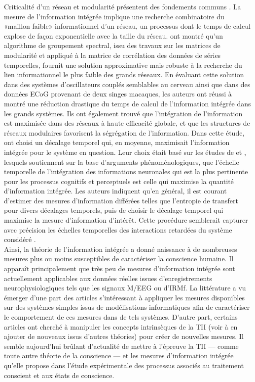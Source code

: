 Criticalité d'un réseau et modularité présentent des fondements communs \citep{toker2019information}. 
La mesure de l'information intégrée implique une recherche combinatoire du «maillon faible» informationnel d'un réseau, un processus dont le temps de calcul explose de façon exponentielle avec la taille du réseau. 
\cite{toker2019information} ont montré qu'un algorithme de groupement spectral, issu des travaux sur les matrices de modularité et appliqué à la matrice de corrélation des données de séries temporelles, fournit une solution approximative mais robuste à la recherche du lien informationnel le plus faible des grands réseaux. 
En évaluant cette solution dans des systèmes d'oscillateurs couplés semblables au cerveau ainsi que dans des données ECoG provenant de deux singes macaques, les auteurs ont réussi à montré une réduction drastique du temps de calcul de l'information intégrée dans les grands systèmes. 
Ils ont également trouvé que l'intégration de l'information est maximisée dans des réseaux à haute efficacité globale, et que les structures de réseaux modulaires favorisent la ségrégation de l'information.
Dans cette étude, \cite{toker2019information} ont choisi un décalage temporel qui, en moyenne, maximisait l'information intégrée pour le système en question. 
Leur choix était basé sur les études de \cite{oizumi2014phenomenology} et \cite{hoel2016can}, lesquels soutiennent sur la base d'arguments phénoménologiques, que l'échelle temporelle de l'intégration des informations neuronales qui est la plus pertinente pour les processus cognitifs et perceptuels est celle qui maximise la quantité d'information intégrée. 
Les auteurs indiquent qu'en général, il est courant d'estimer des mesures d'information différées telles que l'entropie de transfert pour divers décalages temporels, puis de choisir le décalage temporel qui maximise la mesure d'information d'intérêt. 
Cette procédure semblerait capturer avec précision les échelles temporelles des interactions retardées du système considéré \citep{wibral2013measuring}. \\

Ainsi, la théorie de l'information intégrée a donné naissance à de nombreuses mesures plus ou moins susceptibles de caractériser la conscience humaine. 
Il apparaît principalement que très peu de mesures d'information intégrée sont actuellement applicables aux données réelles issues d'enregistrements neurophysiologiques tels que les signaux M/EEG ou d'IRMf. 
La littérature a vu émerger d'une part des articles s'intéressant à appliquer les mesures disponibles sur des systèmes simples issus de modélisations informatiques afin de caractériser le comportement de ces mesures dans de tels systèmes. 
D'autre part, certains articles ont cherché à manipuler les concepts intrinsèques de la TII (voir à en ajouter de nouveaux issus d'autres théories) pour créer de nouvelles mesures. 
Il semble aujourd'hui brûlant d'actualité de mettre à l'épreuve la TII --- comme toute autre théorie de la conscience --- et les mesures d’information intégrée qu'elle propose dans l'étude expérimentale des processus associés au traitement conscient et aux états de conscience.  

